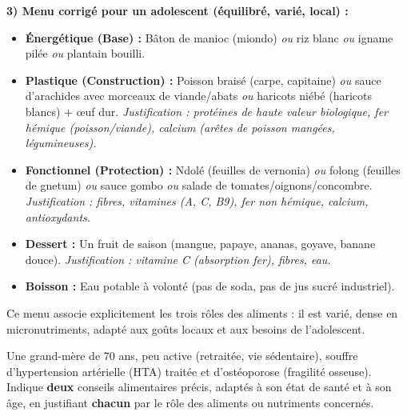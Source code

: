 \documentclass[11pt]{article}
\begin{document}
\begin{exoresolu}
\textbf{3) Menu corrigé pour un adolescent (équilibré, varié, local) :}
\begin{itemize}
  \item \textbf{Énergétique (Base) :} Bâton de manioc (miondo) \emph{ou} riz blanc \emph{ou} igname pilée \emph{ou} plantain bouilli.
  \item \textbf{Plastique (Construction) :} Poisson braisé (carpe, capitaine) \emph{ou} sauce d'arachides avec morceaux de viande/abats \emph{ou} haricots niébé (haricots blancs) + œuf dur. \textit{Justification : protéines de haute valeur biologique, fer hémique (poisson/viande), calcium (arêtes de poisson mangées, légumineuses).}
  \item \textbf{Fonctionnel (Protection) :} Ndolé (feuilles de vernonia) \emph{ou} folong (feuilles de gnetum) \emph{ou} sauce gombo \emph{ou} salade de tomates/oignons/concombre. \textit{Justification : fibres, vitamines (A, C, B9), fer non hémique, calcium, antioxydants.}
  \item \textbf{Dessert :} Un fruit de saison (mangue, papaye, ananas, goyave, banane douce). \textit{Justification : vitamine C (absorption fer), fibres, eau.}
  \item \textbf{Boisson :} Eau potable à volonté (pas de soda, pas de jus sucré industriel).
\end{itemize}
Ce menu associe explicitement les trois rôles des aliments : il est varié, dense en micronutriments, adapté aux goûts locaux et aux besoins de l'adolescent.
\end{exoresolu}

\begin{exercice}
Une grand-mère de 70 ans, peu active (retraitée, vie sédentaire), souffre d'hypertension artérielle (HTA) traitée et d'ostéoporose (fragilité osseuse). Indique \textbf{deux} conseils alimentaires précis, adaptés à son état de santé et à son âge, en justifiant \textbf{chacun} par le rôle des aliments ou nutriments concernés.
\end{exercice}
\end{document}
